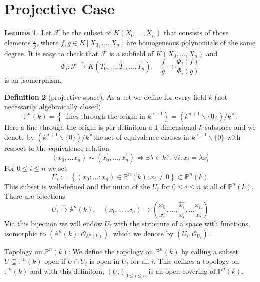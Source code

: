 \documentclass[12pt,a4paper]{book}
\theoremstyle{definition}
\newtheorem{defn}{Definition}[section]
\newtheorem{lem}[defn]{Lemma}
\begin{document}
\section{Projective Case}
\begin{lem}
    Let $\mathcal{F}$ be the subset of $K\left(X_0, \ldots, X_n\right)$ that consists of those elements $\frac{f}{g}$, where $f, g \in K\left[X_0, \ldots, X_n\right]$ are homogeneous polynomials of the same degree. It is easy to check that $\mathcal{F}$ is a subfield of $K\left(X_0, \ldots, X_n\right)$ and 
    $$
    \Phi_i: \mathcal{F} \xrightarrow{\sim} K\left(T_0, \ldots, \widehat{T}_i, \ldots, T_n\right), \quad \frac{f}{g} \mapsto \frac{\Phi_i(f)}{\Phi_i(g)}
    $$
    is an isomorphism.
\end{lem}
\begin{defn}[projective space]
    As a set we define for every field $k$ (not necessarily algebraically closed)
    $$
    \mathbb{P}^n(k)=\left\{\text { lines through the origin in } k^{n+1}\right\}=\left(k^{n+1} \backslash\{0\}\right) / k^{\times} .
    $$
    Here a line through the origin is per definition a 1-dimensional $k$-subspace and we denote by $\left(k^{n+1} \backslash\{0\}\right) / k^{\times}$the set of equivalence classes in $k^{n+1} \backslash\{0\}$ with respect to the equivalence relation
    $$
    \left(x_0, \ldots x_n\right) \sim\left(x_0^{\prime}, \ldots, x_n^{\prime}\right) \Leftrightarrow \exists \lambda \in k^{\times}: \forall i: x_i=\lambda x_i^{\prime}
    $$
    For $0 \leq i \leq n$ we set
    $$
    U_i:=\left\{\left(x_0: \ldots: x_n\right) \in \mathbb{P}^n(k) ; x_i \neq 0\right\} \subset \mathbb{P}^n(k)
    $$
    This subset is well-defined and the union of the $U_i$ for $0 \leq i \leq n$ is all of $\mathbb{P}^n(k)$. There are bijections
$$
U_i \xrightarrow{\sim} \mathbb{A}^n(k), \quad\left(x_0: \ldots: x_n\right) \mapsto\left(\frac{x_0}{x_i}, \ldots, \frac{\widehat{x_i}}{x_i}, \ldots \frac{x_n}{x_i}\right)
$$
Via this bijection we will endow $U_i$ with the structure of a space with functions, isomorphic to $\left(\mathbb{A}^n(k), \mathscr{O}_{\mathbb{A}^n(k)}\right)$, which we denote by $\left(U_i, \mathscr{O}_{U_i}\right)$.
    
Topology on $\mathbb{P}^n(k)$: We define the topology on $\mathbb{P}^n(k)$ by calling a subset $U \subseteq \mathbb{P}^n(k)$ open if $U \cap U_i$ is open in $U_i$ for all $i$. This defines a topology on $\mathbb{P}^n(k)$ and with this definition, $\left(U_i\right)_{0 \leq i \leq n}$ is an open covering of $\mathbb{P}^n(k)$. 


\end{defn}
\end{document}
